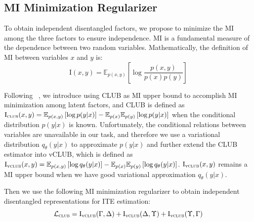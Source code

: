 \documentclass[sigconf]{acmart}
\begin{document}
\subsection{MI Minimization Regularizer}
To obtain independent disentangled factors, we propose to minimize the MI among the three factors to ensure independence. MI is a fundamental measure of the dependence between two random variables. Mathematically, the definition of MI between variables $x$ and $y$ is:
\begin{equation}
\label{E1}
    \mathrm{I}(x,y)=\mathbb{E}_{p(x,y)}\left [ \log \frac{p(x,y)}{p(x)p(y)}\right]
\end{equation}\par
Following ~\citep{Cheng2020CLUBAC}, we introduce using CLUB as MI upper bound to accomplish MI minimization among latent factors, and \textsc{CLUB} is defined as $\mathrm{I}_{\textsc{club}}(x,y)=\mathbb{E}_{p(x,y)}\left [\log p(y|x) \right ] - \mathbb{E}_{p(x)}\mathbb{E}_{p(y)}\left [\log p(y|x) \right ]$ when the conditional distribution $p(y|x)$ is known. Unfortunately, the conditional relations between variables are unavailable in our task, and therefore we use a variational distribution $q_{\theta}(y|x)$ to approximate $p(y|x) $ and further extend the CLUB estimator into vCLUB, which is defined as $\mathrm{I}_{\mathrm{v}\textsc{club}}(x,y)=\mathbb{E}_{p(x,y)}\left [\log q_{\theta}(y|x) \right ] - \mathbb{E}_{p(x)}\mathbb{E}_{p(y)}\left [\log q_{\theta}(y|x) \right ]$. $\mathrm{I}_{\mathrm{v}\textsc{club}}(x,y)$ remains a MI upper bound when we have good variational approximation $q_{\theta}(y|x)$.\par
Then we use the following MI minimization regularizer to obtain independent disentangled representations for ITE estimation:
\begin{equation}
\label{E1}
    \mathcal{L}_{\textsc{club}} = \mathrm{I}_{\mathrm{v}\textsc{club}}(\Gamma,\Delta) + \mathrm{I}_{\mathrm{v}\textsc{club}}(\Delta,\Upsilon) + \mathrm{I}_{\mathrm{v}\textsc{club}}(\Upsilon,\Gamma)
\end{equation}\par
\end{document}
